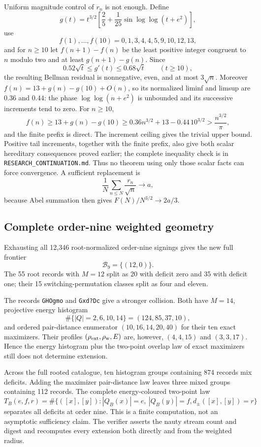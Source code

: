 \documentclass[11pt]{article}
\begin{document}
Uniform magnitude control of $r_n$ is not enough.  Define
\[
 g(t)=t^{3/2}\left[
 \frac25+\frac1{25}\sin\log\log(t+e^2)\right],
\]
use
\[
 f(1),\ldots,f(10)=0,1,3,4,4,5,9,10,12,13,
\]
and for $n\ge10$ let $f(n+1)-f(n)$ be the least positive integer congruent
to $n$ modulo two and at least $g(n+1)-g(n)$.  Since
\[
 0.52\sqrt t\le g'(t)\le0.68\sqrt t\qquad(t\ge10),
\]
the resulting Bellman residual is nonnegative, even, and at most
$3\sqrt n$.  Moreover
$f(n)=13+g(n)-g(10)+O(n)$, so its normalized liminf and limsup are
$0.36$ and $0.44$: the phase $\log\log(n+e^2)$ is unbounded and its
successive increments tend to zero.  For $n\ge10$,
\[
 f(n)\ge13+g(n)-g(10)
 \ge0.36n^{3/2}+13-0.44\,10^{3/2}
 >\frac{n^{3/2}}{\pi},
\]
and the finite prefix is direct.  The increment ceiling gives the trivial
upper bound.  Positive tail increments, together with the finite prefix,
also give both scalar hereditary consequences proved earlier; the complete
inequality check is in \texttt{RESEARCH\_CONTINUATION.md}.  Thus no theorem
using only those scalar facts can force convergence.  A sufficient
replacement is
\[
 \frac1N\sum_{n\le N}\frac{r_n}{\sqrt n}\longrightarrow a,
\]
because Abel summation then gives $F(N)/N^{3/2}\to2a/3$.

\subsection{Complete order-nine weighted geometry}

Exhausting all 12,346 root-normalized order-nine signings gives the new full
frontier
\[
 \mathcal B_9=\{(12,0)\}.
\]
The 55 root records with $M=12$ split as 20 with deficit zero and 35 with
deficit one; their 15 switching-permutation classes split as four and eleven.

The records \texttt{GHOgmo} and \texttt{Gxd?Dc} give a stronger collision.
Both have $M=14$, projective energy histogram
\[
 \#\{|Q|=2,6,10,14\}=(124,85,37,10),
\]
and ordered pair-distance enumerator $(10,16,14,20,40)$ for their ten exact
maximizers.  Their profiles $(\rho_{\rm ext},\rho_{\mathrm w},E)$ are,
however, $(4,4,15)$ and $(3,3,17)$.  Hence the energy histogram plus the
two-point overlap law of exact maximizers still does not determine extension.

Across the full rooted catalogue, ten histogram groups containing 874 records
mix deficits.  Adding the maximizer pair-distance law leaves three mixed
groups containing 112 records.  The complete energy-coloured two-point law
\[
 T_B(e,f,r)=\#\{([x],[y]):|Q_B(x)|=e,\ |Q_B(y)|=f,
 d_\pm([x],[y])=r\}
\]
separates all deficits at order nine.  This is a finite computation, not an
asymptotic sufficiency claim.  The verifier asserts the nauty stream count and
digest and recomputes every extension both directly and from the weighted
radius.
\end{document}
